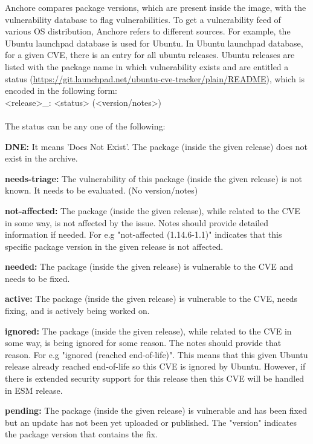 \documentclass[a4paper,num-refs]{oup-contemporary}
\begin{document}
Anchore compares package versions, which are present inside the
image, with the vulnerability database to flag vulnerabilities.
To get a vulnerability feed of various OS distribution, Anchore refers to
different sources. For example, the Ubuntu launchpad database is used for Ubuntu.
In Ubuntu launchpad database, for a given CVE, there is an entry for all ubuntu releases.
Ubuntu releases are listed with the package name
in which vulnerability exists and are entitled a status
(\href{https://git.launchpad.net/ubuntu-cve-tracker/plain/README}{https://git.launchpad.net/ubuntu-cve-tracker/plain/README}), which is
encoded in the following form:
\newline \\
\noindent <release>\_<source-package>: <status> (<version/notes>) \\
\newline\\
The status can be any one of the following:

\textbf{DNE:} It means 'Does Not Exist'. The package (inside the given release) does not exist in the
		archive.

\textbf{needs-triage:} The vulnerability of this package (inside the given release)
		is not known. It needs to be evaluated.  (No version/notes)

\textbf{not-affected:} The package (inside the given release), while related to the
		CVE in some way, is not affected by the issue. Notes should
		provide detailed information if needed. For e.g
		"not-affected (1.14.6-1.1)" indicates that this specific
		package version in the given release is not affected.

\textbf{needed:} The package (inside the given release) is vulnerable to the
		CVE and needs to be fixed.

\textbf{active:} The package (inside the given release) is vulnerable to the
		CVE, needs fixing, and is actively being worked on.

\textbf{ignored:} The package (inside the given release), while related to the
		CVE in some way, is being ignored for some reason.  The
		notes should provide that reason. For e.g "ignored (reached end-of-life)".
		This means that this given Ubuntu release already reached
		end-of-life so this CVE is ignored by Ubuntu. However, if there
		is extended security support for this release then this
		CVE will be handled in ESM release.

\textbf{pending:} The package (inside the given release) is vulnerable and
                  has been fixed but an update has not been yet uploaded or
		  published. The "version" indicates the package version 
		  that contains the fix.
\end{document}
